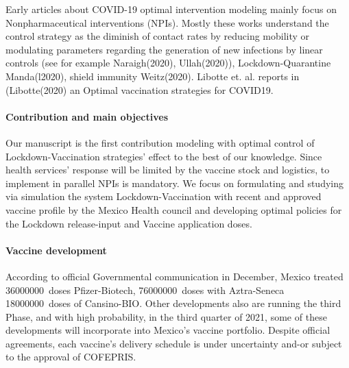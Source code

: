         Early articles about COVID-19 optimal intervention modeling mainly
    focus on Nonpharmaceutical interventions (NPIs). Mostly these works
    understand the control strategy as the diminish of contact rates by
    reducing mobility or modulating parameters regarding the generation of new
    infections by linear controls (see for example Naraigh(2020),
    Ullah(2020)), Lockdown-Quarantine Manda(l2020),  shield immunity
    Weitz(2020). Libotte et. al. reports in (Libotte(2020) an Optimal
    vaccination strategies for COVID19.
\paragraph{Contribution and main objectives}
        Our manuscript is the first contribution modeling with optimal control
    of Lockdown-Vaccination strategies' effect to the best of our knowledge.
    Since health services' response will be limited by the vaccine stock
    and logistics, to implement in parallel NPIs is mandatory. We focus on
    formulating and studying via simulation the system Lockdown-Vaccination
    with recent and approved vaccine profile by the  Mexico Health council and
    developing optimal policies for the Lockdown release-input and Vaccine
    application doses.
\paragraph{Vaccine development}
        According to official Governmental communication in December, Mexico
    treated  \SI{36000000}{doses} Pfizer-Biotech, \SI{76000000}{doses} with
    Aztra-Seneca \SI{18000000}{doses} of Cansino-BIO. Other developments
    also are running the  third Phase, and with high probability,  in the
    third quarter of 2021, some of these developments will incorporate into
    Mexico's vaccine portfolio. Despite official agreements, each vaccine's
    delivery schedule is under uncertainty and-or subject to the approval
    of COFEPRIS.

